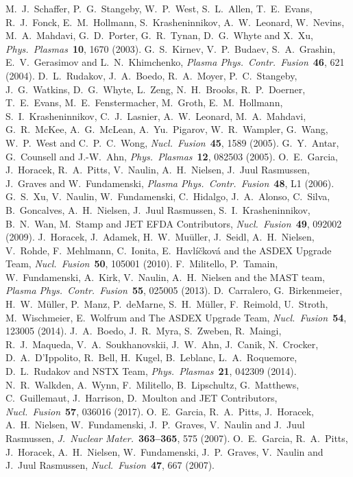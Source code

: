 \documentclass[aps,prb,12pt,a4paper,preprint,amsmath,amssymb,groupedaddress]{revtex4-1}
\newcommand{\JNM}{\textit{J.~Nuclear Mater.}}
\newcommand{\NF}{\textit{Nucl.\ Fusion}}
\newcommand{\PPCF}{\textit{Plasma Phys.\ Contr.\ Fusion}}
\newcommand{\PP}{\textit{Phys.\ Plasmas}}
\begin{document}
\begin{thebibliography}{99}
M.~J.~Schaffer, P.~G.~Stangeby, W.~P.~West, S.~L.~Allen, T.~E.~Evans, R.~J.~Fonck,
E.~M.~Hollmann, S.~Krasheninnikov, A.~W.~Leonard, W.~Nevins, M.~A.~Mahdavi,
G.~D.~Porter, G.~R.~Tynan, D.~G.~Whyte and X.~Xu, \PP\ {\bf 10}, 1670 (2003).
%
G.~S.~Kirnev, V.~P.~Budaev, S.~A.~Grashin, E.~V.~Gerasimov and L.~N.~Khimchenko, \PPCF\ {\bf 46}, 621 (2004).
%
D.~L.~Rudakov, J.~A.~Boedo, R.~A.~Moyer, P.~C.~Stangeby, J.~G.~Watkins, D.~G.~Whyte, L.~Zeng, N.~H.~Brooks, R.~P.~Doerner, T.~E.~Evans, M.~E.~Fenstermacher, M.~Groth, E.~M.~Hollmann, S.~I.~Krasheninnikov, C.~J.~Lasnier, A.~W.~Leonard, M.~A.~Mahdavi, G.~R.~McKee, A.~G.~Mc{L}ean, A.~Yu.~Pigarov, W.~R.~Wampler, G.~Wang, W.~P.~West and C.~P.~C.~Wong, \NF\ {\bf 45}, 1589 (2005).
%
G.~Y.~Antar, G.~Counsell and J.-W.~Ahn, \PP\ {\bf 12}, 082503 (2005).
%
O.~E.~Garcia, J.~Horacek, R.~A.~Pitts, V.~Naulin, A.~H.~Nielsen, J.~Juul Rasmussen, J.~Graves and W.~Fundamenski, \PPCF\ {\bf 48}, L1 (2006).
%
G.~S.~Xu, V.~Naulin, W.~Fundamenski, C.~Hidalgo, J.~A.~Alonso, C.~Silva, B.~Goncalves, A.~H.~Nielsen, J.~Juul Rasmussen, S.~I.~Krasheninnikov, B.~N.~Wan, M.~Stamp and JET EFDA Contributors, \NF\ {\bf 49}, 092002 (2009).
%
J.~Horacek, J.~Adamek, H.~W.~Mu{\"u}ller, J.~Seidl, A.~H.~Nielsen, V.~Rohde, F.~Mehlmann, C.~Ionita, E.~Havl{\'i}{\v{c}}kov{\'a} and the ASDEX Upgrade Team, \NF\ {\bf 50}, 105001 (2010).
%
F.~Militello, P.~Tamain, W.~Fundamenski, A.~Kirk, V.~Naulin, A.~H.~Nielsen and the MAST team, \PPCF\ {\bf 55}, 025005 (2013).
%
D.~Carralero, G.~Birkenmeier, H.~W.~M{\"u}ller, P.~Manz, P.~de{M}arne, S.~H.~M{\"u}ller, F.~Reimold, U.~Stroth, M.~Wischmeier, E.~Wolfrum and {T}he ASDEX {U}pgrade {T}eam, \NF\ {\bf 54}, 123005 (2014).
%
J.~A.~Boedo, J.~R.~Myra, S.~Zweben, R.~Maingi, R.~J.~Maqueda, V.~A.~Soukhanovskii, J.~W.~Ahn, J.~Canik, N.~Crocker, D.~A.~D'{I}ppolito, R.~Bell, H.~Kugel, B.~Leblanc, L.~A.~Roquemore, D.~L.~Rudakov and NSTX Team, \PP\ {\bf 21}, 042309 (2014).
%
N.~R.~Walkden, A.~Wynn, F.~Militello, B.~Lipschultz, G.~Matthews, C.~Guillemaut, J.~Harrison, D.~Moulton and JET Contributors, \NF\ {\bf 57}, 036016 (2017).
%
%
O.~E.~Garcia, R.~A.~Pitts, J.~Horacek, A.~H.~Nielsen, W.~Fundamenski, J.~P.~Graves, V.~Naulin and J.~Juul Rasmussen, \JNM\ {\bf 363--365}, 575 (2007).
%
O.~E.~Garcia, R.~A.~Pitts, J.~Horacek, A.~H.~Nielsen, W.~Fundamenski, J.~P.~Graves, V.~Naulin and J.~Juul Rasmussen, \NF\ {\bf 47}, 667 (2007).

\end{thebibliography}
\end{document}

